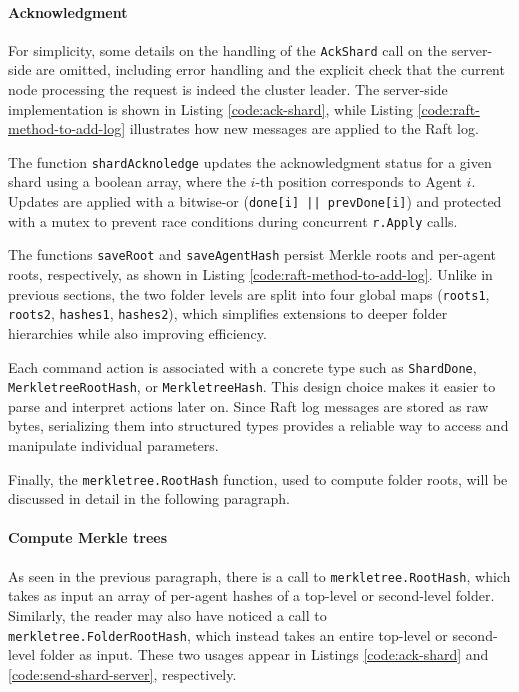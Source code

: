 \paragraph{Acknowledgment}

For simplicity, some details on the handling of the \texttt{AckShard} call on the server-side are omitted, including error handling and the explicit check that the current node processing the
 request is indeed the cluster leader. The server-side implementation is shown in Listing \ref{code:ack-shard}, while Listing \ref{code:raft-method-to-add-log} illustrates how new messages are
 applied to the Raft log.

The function \texttt{shardAcknoledge} updates the acknowledgment status for a
given shard using a boolean array, where the $i$-th position corresponds to
Agent $i$. Updates are applied with a bitwise-or (\texttt{done[i] || prevDone[i]}) and protected with a mutex to prevent race conditions during concurrent \texttt{r.Apply} calls.

The functions \texttt{saveRoot} and \texttt{saveAgentHash} persist Merkle roots and per-agent roots, respectively, as shown in Listing \ref{code:raft-method-to-add-log}. Unlike in previous sections, the two folder levels are split into four global maps (\texttt{roots1}, \texttt{roots2}, \texttt{hashes1}, \texttt{hashes2}), which simplifies extensions to deeper folder hierarchies while also improving efficiency.

Each command action is associated with a concrete type such as \texttt{ShardDone}, \texttt{MerkletreeRootHash}, or \texttt{MerkletreeHash}. This design choice makes it easier to parse and interpret actions later on. Since Raft log messages are stored as raw bytes, serializing them into structured types provides a reliable way to access and manipulate individual parameters.

Finally, the \texttt{merkletree.RootHash} function, used to compute folder roots, will be discussed in detail in the following paragraph.

\paragraph{Compute Merkle trees}

As seen in the previous paragraph, there is a call to \texttt{merkletree.RootHash}, which
takes as input an array of per-agent hashes of a top-level or second-level folder. 
Similarly, the reader may also have noticed a call to 
\texttt{merkletree.FolderRootHash}, which instead takes an entire top-level or second-level
folder as input. These two usages appear in Listings \ref{code:ack-shard} and
\ref{code:send-shard-server}, respectively.  

